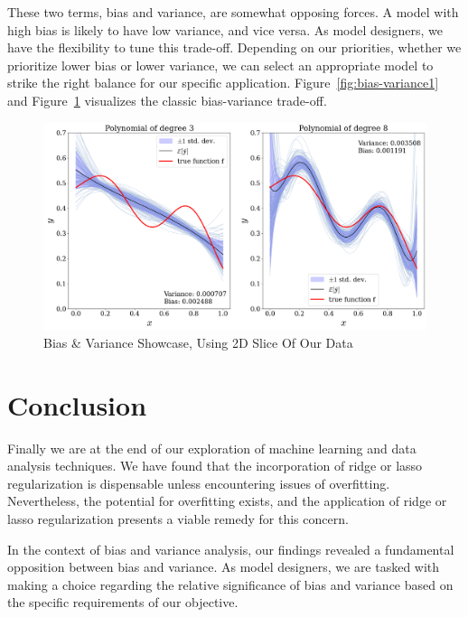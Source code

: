 \documentclass[twoside,11pt]{report}
\begin{document}
These two terms, bias and variance, are somewhat opposing forces. A model with high bias is likely to 
have low variance, and vice versa. As model designers, we have the flexibility to tune this trade-off. 
Depending on our priorities, whether we prioritize lower bias or lower variance, we can select an appropriate 
model to strike the right balance for our specific application.
Figure~\ref{fig:bias-variance1} and Figure~\ref{fig:bias-variance2} visualizes the classic bias-variance trade-off.
\begin{figure}[!h]
    \begin{center}
        \includegraphics[width=1.0\textwidth]{../runsAndAdditions/bias-variance2.png}
    \end{center}
    \caption{Bias \& Variance Showcase, Using 2D Slice Of Our Data}\label{fig:bias-variance2}
\end{figure}








\section{Conclusion}
\label{sec:conclusion}

Finally we are at the end of our exploration of machine learning and data analysis techniques. 
We have found that the incorporation of ridge or lasso regularization is dispensable unless encountering issues of overfitting. 
Nevertheless, the potential for overfitting exists, and the application of ridge or lasso regularization presents a viable remedy for this concern.

In the context of bias and variance analysis, our findings revealed a fundamental opposition between bias and variance. 
As model designers, we are tasked with making a choice regarding the relative significance of bias and variance based on the specific requirements of our objective.
\end{document}
